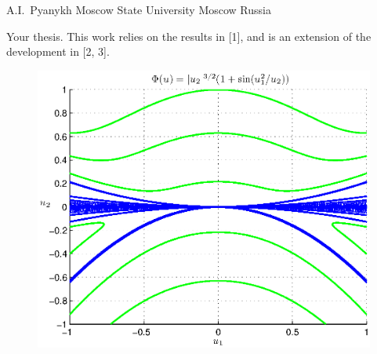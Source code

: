 %
%
%

{%
A.I.~Pyanykh%
}
{%
Moscow State University%
}
{%
Moscow%
}
{%
Russia%
}

%
%
Your thesis. This work relies on the results in [1], and is an extension of the development in [2, 3].

\begin{figure}[!h]
  \centering
  \includegraphics[width=0.7\maxpicturewidth]{your_figure.eps}
\end{figure}

